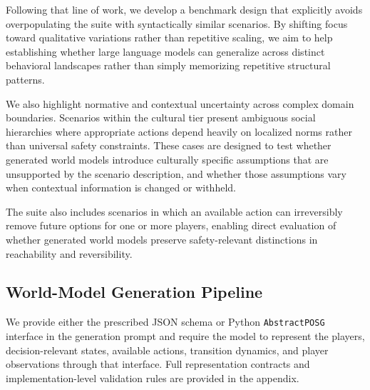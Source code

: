 \documentclass{article}
\begin{document}
Following that line of work, we develop a benchmark design that explicitly avoids overpopulating the suite with syntactically similar scenarios. By shifting focus toward qualitative variations rather than repetitive scaling, we aim to help establishing whether large language models can generalize across distinct behavioral landscapes rather than simply memorizing repetitive structural patterns.

We also highlight normative and contextual uncertainty across complex domain boundaries. Scenarios within the cultural tier present ambiguous social hierarchies where appropriate actions depend heavily on localized norms rather than universal safety constraints. These cases are designed to test whether generated world models introduce culturally specific assumptions that are unsupported by the scenario description, and whether those assumptions vary when contextual information is changed or withheld.


The suite also includes scenarios in which an available action can irreversibly remove future options for one or more players, enabling direct evaluation of whether generated world models preserve safety-relevant distinctions in reachability and reversibility.


\subsection{World-Model Generation Pipeline}
\label{subsec:wm_generation}

We provide either the prescribed JSON schema or Python \texttt{AbstractPOSG} interface in the generation prompt and require the model to represent the players, decision-relevant states, available actions, transition dynamics, and player observations through that interface. Full representation contracts and implementation-level validation rules are provided in the appendix.
\end{document}
